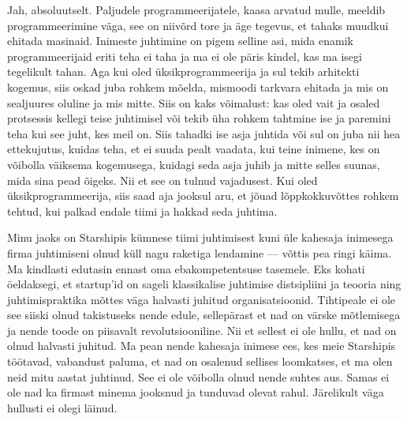 
Jah, absoluutselt. Paljudele programmeerijatele, 
kaasa arvatud mulle, meeldib programmeerimine väga, see on niivõrd 
tore ja äge tegevus, et tahaks  
muudkui ehitada masinaid. Inimeste juhtimine on pigem selline asi, mida 
enamik programmeerijaid eriti teha ei taha ja ma ei ole päris kindel, kas ma 
isegi tegelikult tahan. Aga kui 
oled üksikprogrammeerija ja sul tekib arhitekti kogemus, siis 
oskad juba rohkem mõelda, mismoodi tarkvara ehitada ja mis 
on sealjuures oluline ja mis mitte. Siis on kaks võimalust: 
kas oled vait ja osaled protsessis kellegi teise juhtimisel või tekib üha 
rohkem tahtmine ise ja paremini 
teha kui see juht, kes meil on. Siis tahadki ise asja juhtida või sul on juba 
nii 
hea ettekujutus, kuidas teha, et ei suuda pealt vaadata, kui 
teine inimene, kes on võibolla väiksema kogemusega,  
kuidagi seda asja juhib ja mitte selles suunas, mida sina pead õigeks. Nii et 
see on tulnud vajadusest. Kui 
oled üksikprogrammeerija, siis saad aja jooksul aru, et jõuad
lõppkokkuvõttes rohkem tehtud, kui palkad 
endale tiimi ja hakkad seda juhtima. 

Minu jaoks on Starshipis kümnese 
tiimi juhtimisest kuni üle kahesaja inimesega firma juhtimiseni olnud küll nagu 
raketiga lendamine --- võttis pea ringi käima. Ma kindlasti 
edutasin ennast oma ebakompetentsuse tasemele. Eks kohati öeldaksegi, et 
startup'id on sageli klassikalise juhtimise 
distsipliini ja teooria ning juhtimispraktika mõttes väga halvasti juhitud 
organisatsioonid. Tihtipeale ei ole see siiski olnud takistuseks nende edule, 
sellepärast et nad on värske mõtlemisega ja nende toode on 
piisavalt revolutsiooniline. Nii et sellest ei ole 
hullu, et nad on olnud halvasti juhitud. Ma pean nende kahesaja 
inimese ees, kes meie Starshipis töötavad, vabandust paluma, et nad on osalenud 
sellises loomkatses, 
et ma olen neid mitu aastat juhtinud. See ei ole võibolla olnud nende 
suhtes aus. Samas ei ole nad ka firmast minema jooksnud 
ja tunduvad olevat rahul. Järelikult väga hullusti ei olegi läinud.

